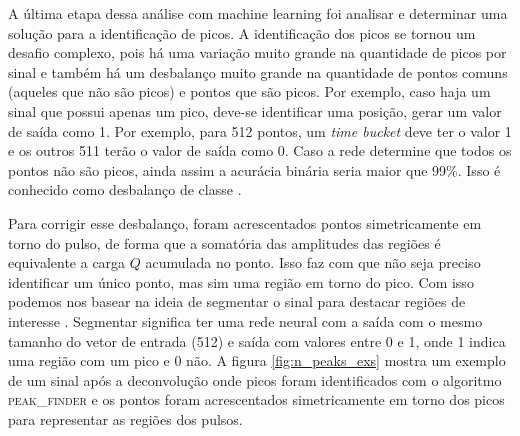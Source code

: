 \documentclass[a4paper,12pt,oneside]{book}
\begin{document}
\par A última etapa dessa análise com machine learning foi analisar e determinar uma solução para a identificação de picos. A identificação dos picos se tornou um desafio complexo, pois há uma variação muito grande na quantidade de picos por sinal e também há um desbalanço muito grande na quantidade de pontos comuns (aqueles que não são picos) e pontos que são picos. Por exemplo, caso haja um sinal que possui apenas um pico, deve-se identificar uma posição, gerar um valor de saída como 1. Por exemplo, para 512 pontos, um \textit{time bucket} deve ter o valor 1 e os outros 511 terão o valor de saída como 0. Caso a rede determine que todos os pontos não são picos, ainda assim a acurácia binária seria maior que 99\%. Isso é conhecido como desbalanço de classe \cite{inproceedings}.

\par Para corrigir esse desbalanço, foram acrescentados pontos simetricamente em torno do pulso, de forma que a somatória das amplitudes das regiões é equivalente a carga $Q$ acumulada no ponto. Isso faz com que não seja preciso identificar um único ponto, mas sim uma região em torno do pico. Com isso podemos nos basear na ideia de segmentar o sinal para destacar regiões de interesse \cite{aly2011research}. Segmentar significa ter uma rede neural com a saída com o mesmo tamanho do vetor de entrada (512) e saída com valores entre 0 e 1, onde 1 indica uma região com um pico e 0 não. A figura \ref{fig:n_peaks_exs} mostra um exemplo de um sinal após a deconvolução onde picos foram identificados com o algoritmo \textsc{peak\_finder} e os pontos foram acrescentados simetricamente em torno dos picos para representar as regiões dos pulsos.

\end{document}
